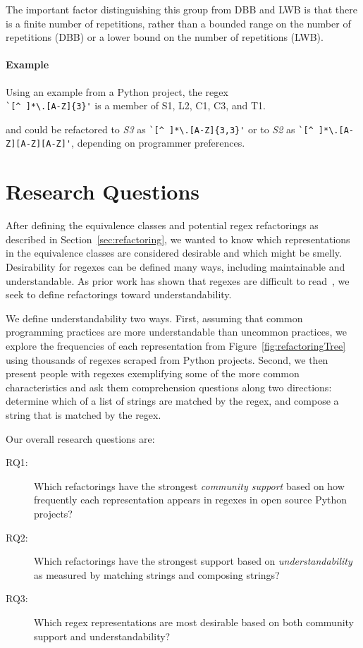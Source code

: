 The important factor distinguishing this group from DBB and LWB is that there is a finite number of repetitions, rather than a bounded range on the number of repetitions (DBB) or a lower bound on the number of repetitions (LWB). 

\paragraph{Example}
Using an example from a Python project, the regex\\ \verb!`[^ ]*\.[A-Z]{3}'! is a member of S1, L2, C1, C3, and T1. 

 and could be refactored to \emph{S3} as \verb!`[^ ]*\.[A-Z]{3,3}'!  or to \emph{S2} as \verb!`[^ ]*\.[A-Z][A-Z][A-Z]'!, depending on programmer preferences.







\section{Research Questions}
\label{sec:study}
After defining the equivalence classes and potential  regex refactorings as described in Section~\ref{sec:refactoring}, we wanted to know which representations in the equivalence classes  are considered desirable and which might be smelly. Desirability for regexes can be defined many ways, including maintainable and understandable. As prior work has shown that regexes are difficult to read~\cite{}, we seek to define refactorings toward understandability.

We define understandability two ways. First, assuming that common programming practices are more understandable than uncommon practices, we explore the frequencies of each representation from Figure~\ref{fig:refactoringTree} using thousands of regexes scraped from Python projects. Second, we then present people with regexes exemplifying some of the more common characteristics and ask them comprehension questions along two directions: determine which of a list of strings are matched by the regex, and compose a string that is matched by the regex.

Our overall research questions are:
\begin{description}
\item[RQ1:] Which refactorings have the strongest \emph{community support} based on how frequently each representation appears in regexes in open source Python projects?
\item[RQ2:] Which refactorings have the strongest support based on \emph{understandability} as measured by matching strings and composing strings?
\item[RQ3:] Which regex representations are most desirable based on both community support and understandability?
\end{description}



